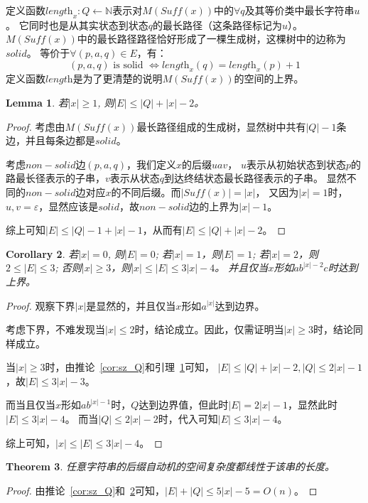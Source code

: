 \documentclass[UTF8]{ctexart}
\newtheorem{thm}{Theorem}[subsection]
\newtheorem{cor}[thm]{Corollary}
\newtheorem{lem}[thm]{Lemma}
\theoremstyle{definition}
\theoremstyle{remark}
\numberwithin{equation}{subsection}
\newcommand{\Suff}{\textit{Suff}}
\newcommand{\len}[1][x]{\textit{length}_{#1}}
\begin{document}
	定义函数$\len: Q \leftarrow \mathbb{N}$表示对$M(\Suff(x))$中的$\forall q$及其等价类中最长字符串$u$。
	它同时也是从其实状态到状态$q$的最长路径（这条路径标记为$u$）。
	$M(\Suff(x))$中的最长路径路径恰好形成了一棵生成树，这棵树中的边称为$solid$。
	等价于$\forall (p,a,q) \in E$，有：
	\[
		(p, a, q) \text{ is solid } \Longleftrightarrow \len(q) = \len(p) + 1
	\]
	定义函数$\textit{length}$是为了更清楚的说明$M(\Suff(x))$的空间的上界。
	
	\begin{lem}
	\label{lem:sz_E}
		若$|x| \ge 1$, 则$|E| \le |Q| + |x| - 2$。
	\end{lem}
	\begin{proof}
		考虑由$M(\Suff(x))$最长路径组成的生成树，显然树中共有$|Q| - 1$条边，并且每条边都是$solid$。
		
		考虑$non-solid$边$(p, a, q)$，我们定义$x$的后缀$uav$，
		$u$表示从初始状态到状态$p$的路最长径表示的子串，$v$表示从状态$q$到达终结状态最长路径表示的子串。
		显然不同的$non-solid$边对应$x$的不同后缀。而$|\Suff(x)| = |x|$，
		又因为$|x| = 1$时，$u,v = \varepsilon$，显然应该是$solid$，故$non-solid$边的上界为$|x| - 1$。
		
		综上可知$|E| \le |Q|-1 + |x|-1$，从而有$|E| \le |Q|+|x|-2$。
	\end{proof}
	
	\begin{cor}
	\label{cor:sz_E}
		若$|x| = 0$, 则$|E| = 0$;
		若$|x| = 1$，则$|E| = 1$;
		若$|x| = 2$，则$2 \le |E| \le 3$;
		否则$|x| \ge 3$，则$|x| \le |E| \le 3|x|-4$。
		并且仅当$x$形如$ab^{|x|-2}c$时达到上界。
	\end{cor}
	\begin{proof}
		观察下界$|x|$是显然的，并且仅当$x$形如$a^{|x|}$达到边界。
		
		考虑下界，不难发现当$|x| \le 2$时，结论成立。因此，仅需证明当$|x| \ge 3$时，结论同样成立。
		
		当$|x| \ge 3$时，由推论~\ref{cor:sz_Q}和引理~\ref{lem:sz_E}可知，
		$|E| \le |Q|+|x|-2, |Q| \le 2|x|-1$，故$|E| \le 3|x|-3$。
		
		而当且仅当$x$形如$ab^{|x|-1}$时，$Q$达到边界值，但此时$|E| = 2|x|-1$，显然此时$|E| \le 3|x|-4$。
		而当$|Q| \le 2|x|-2$时，代入可知$|E| \le 3|x|-4$。
		
		综上可知，$|x| \le |E| \le 3|x|-4$。
	\end{proof}
	
	\begin{thm}
	\label{thm:sz_suffix_automata}
		任意字符串的后缀自动机的空间复杂度都线性于该串的长度。
	\end{thm}
	\begin{proof}
	由推论~\ref{cor:sz_Q}和~\ref{cor:sz_E}可知，$|E|+|Q| \le 5|x|-5 = O(n)$。
	\end{proof}
	
\end{document}
